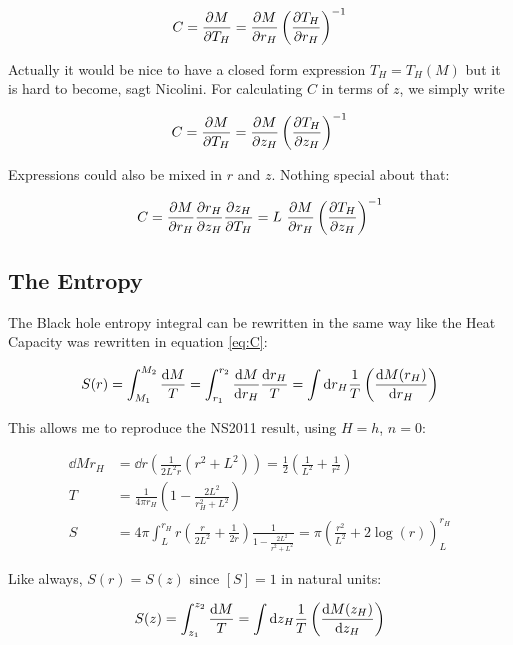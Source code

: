 \documentclass[10pt,a4paper, fleqn]{article}
\begin{document}
\begin{equation}
C = \frac{\partial M}{\partial T_H} = \frac{\partial M}{\partial r_H}\left(\frac{\partial T_H}{\partial r_H}\right)^{-1} \label{eq:C}
\end{equation}

Actually it would be nice to have a closed form expression $T_H = T_H(M)$ but it is hard to become, sagt Nicolini. For calculating $C$ in terms of $z$, we simply write

\begin{equation}
C = \frac{\partial M}{\partial T_H} = \frac{\partial M}{\partial z_H} \left(\frac{\partial T_H}{\partial z_H}\right)^{-1}
\end{equation}

Expressions could also be mixed in $r$ and $z$. Nothing special about that:

\begin{equation}
C = \frac{\partial M}{\partial r_H} \frac{\partial r_H}{\partial z_H} \frac{\partial z_H}{\partial T_H} = L ~\frac{\partial M}{\partial r_H} \left( \frac{\partial T_H}{\partial z_H} \right)^{-1}
\end{equation}

\subsection{The Entropy}
The Black hole entropy integral can be rewritten in the same way like the Heat Capacity was rewritten in equation \ref{eq:C}:

\begin{equation}
S(r) = \int^{M_2}_{M_1} \frac{\mathrm{d} M}T = \int_{r_1}^{r_2} \frac{\mathrm{d} M}{\mathrm{d} r_H} \frac {\mathrm{d} r_H}T = \int \mathrm{d} r_H \frac 1T \left( \frac{\mathrm{d} M(r_H)}{\mathrm{d} r_H} \right)
\end{equation}

This allows me to reproduce the NS2011 result, using $H=h$, $n=0$:

\begin{align}
\dd{M}{r_H} &= \dd {}r \left( \frac{1}{2L^2 r} (r^2 + L^2) \right) = \frac 12 \left( \frac 1{L^2} + \frac 1{r^2} \right) \\
T &= \frac 1{4\pi r_H} \left( 1 - \frac{2 L^2}{r_H^2 + L^2} \right) \\
S &= 4\pi \int_L^{r_H} r \left(\frac r{2L^2} + \frac 1{2r}\right) \frac 1{1 - \frac{2 L^2}{r^2 + L^2} }
= \pi  \left(\frac{r^2}{L^2}+2 \log (r)\right)_L^{r_H}
\end{align}

Like always, $S(r)=S(z)$ since $[S]=1$ in natural units:

\begin{equation}
S(z) = \int^{z_2}_{z_1} \frac{\mathrm{d} M}T = \int \mathrm{d} z_H \frac 1T \left( \frac{\mathrm{d} M(z_H)}{\mathrm{d} z_H} \right)
\end{equation}
\end{document}
